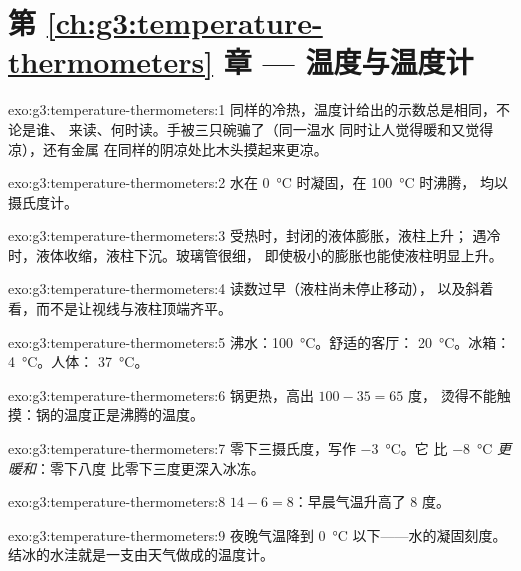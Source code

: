 \section*{第 \ref{ch:g3:temperature-thermometers} 章 --- 温度与温度计}

\begin{solution}{exo:g3:temperature-thermometers:1}
同样的冷热，温度计给出的示数总是相同，不论是谁、
来读、何时读。手被三只碗骗了（同一温水
同时让人觉得暖和又觉得凉），还有金属
在同样的阴凉处比木头摸起来更凉。
\end{solution}

\begin{solution}{exo:g3:temperature-thermometers:2}
水在 \qty{0}{\celsius} 时凝固，在 \qty{100}{\celsius} 时沸腾，
均以摄氏度计。
\end{solution}

\begin{solution}{exo:g3:temperature-thermometers:3}
受热时，封闭的液体膨胀，液柱上升；
遇冷时，液体收缩，液柱下沉。玻璃管很细，
即使极小的膨胀也能使液柱明显上升。
\end{solution}

\begin{solution}{exo:g3:temperature-thermometers:4}
读数过早（液柱尚未停止移动），
以及斜着看，而不是让视线与液柱顶端齐平。
\end{solution}

\begin{solution}{exo:g3:temperature-thermometers:5}
沸水：\qty{100}{\celsius}。舒适的客厅：
\qty{20}{\celsius}。冰箱：\qty{4}{\celsius}。人体：
\qty{37}{\celsius}。
\end{solution}

\begin{solution}{exo:g3:temperature-thermometers:6}
锅更热，高出 $100 - 35 = 65$ 度，
烫得不能触摸：锅的温度正是沸腾的温度。
\end{solution}

\begin{solution}{exo:g3:temperature-thermometers:7}
零下三摄氏度，写作 \qty{-3}{\celsius}。它
比 \qty{-8}{\celsius} \emph{更暖和}：零下八度
比零下三度更深入冰冻。
\end{solution}

\begin{solution}{exo:g3:temperature-thermometers:8}
$14 - 6 = 8$：早晨气温升高了 $8$ 度。
\end{solution}

\begin{solution}{exo:g3:temperature-thermometers:9}
夜晚气温降到 \qty{0}{\celsius} 以下——水的凝固刻度。
结冰的水洼就是一支由天气做成的温度计。
\end{solution}

